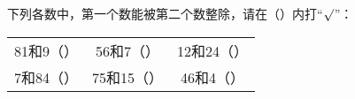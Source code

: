 下列各数中，第一个数能被第二个数整除，请在（\hspace{4em}）内打“$\surd$”：\\
\begin{tabular}{ccc}
	81和9（\hspace{4em}） & 56和7（\hspace{4em}） & 12和24（\hspace{4em}）\\
	7和84（\hspace{4em}） & 75和15（\hspace{4em}） & 46和4（\hspace{4em}）\\
\end{tabular}